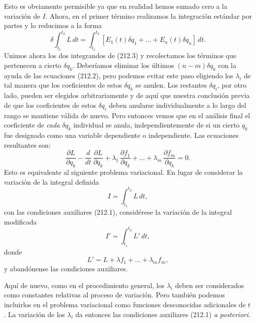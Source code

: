 \documentclass[12pt,a4paper]{book}
\begin{document}
Esto es obviamente permisible ya que en realidad hemos sumado cero a la variación de $I$. Ahora, en el primer término realizamos la integración estándar por partes y lo reducimos a la forma
\begin{equation}
\delta \int_{t_1}^{t_2} L \, dt = \int_{t_1}^{t_2} [E_1(t)\delta q_1 + \ldots + E_n(t)\delta q_n] \, dt. \tag{212.4}
\end{equation}
Unimos ahora los dos integrandos de (212.3) y recolectamos los términos que pertenecen a cierto $\delta q_k$. Deberíamos eliminar los últimos $(n - m)\delta q_k$ con la ayuda de las ecuaciones (212.2), pero podemos evitar este paso eligiendo los $\lambda_i$ de tal manera que los coeficientes de estos $\delta q_k$ se anulen. Los restantes $\delta q_i$, por otro lado, pueden ser elegidos arbitrariamente y de aquí que nuestra conclusión previa de que los coeficientes de estos $\delta q_i$ deben anularse individualmente a lo largo del rango se mantiene válida de nuevo. Pero entonces vemos que en el análisis final el coeficiente de \textit{cada} $\delta q_k$ individual se anula, independientemente de si un cierto $q_k$ fue designado como una variable dependiente o independiente. Las ecuaciones resultantes son:
\begin{equation}
\frac{\partial L}{\partial q_k} - \frac{d}{dt} \, \frac{\partial L}{\partial \dot{q}_k} + \lambda_1 \, \frac{\partial f_1}{\partial q_k} + \ldots + \lambda_m \, \frac{\partial f_m}{\partial q_k} = 0. \tag{212.5}
\end{equation}
Esto es equivalente al siguiente problema variacional. En lugar de considerar la variación de la integral definida
\begin{equation}
I = \int_{t_1}^{t_2} L \, dt, \tag{212.6}
\end{equation}
con las condiciones auxiliares (212.1), considérese la variación de la integral modificada
\begin{equation}
I' = \int_{t_1}^{t_2} L' \, dt, \tag{212.7}
\end{equation}
donde
\begin{equation}
L' = L + \lambda f_1 + \ldots + \lambda_m f_m, \tag{212.8}
\end{equation}
y abandónense las condiciones auxiliares.

Aquí de nuevo, como en el procedimiento general, los $\lambda_i$ deben ser considerados como constantes relativas al proceso de variación. Pero también podemos incluirlos en el problema variacional como funciones desconocidas adicionales de $t$. La variación de los $\lambda_i$ da entonces las condiciones auxiliares (212.1) \textit{a posteriori}.
\end{document}
